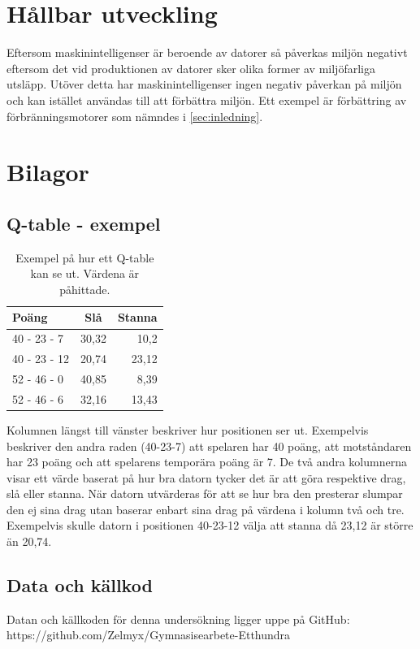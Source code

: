 \documentclass[12pt,a4paper]{article}
\begin{document}
  \section{Hållbar utveckling}\label{sec:hallbarutveckling}
    Eftersom maskinintelligenser är beroende av datorer så påverkas miljön negativt eftersom det vid produktionen av datorer sker olika former av miljöfarliga utsläpp. Utöver detta har maskinintelligenser ingen negativ påverkan på miljön och kan istället användas till att förbättra miljön. Ett exempel är förbättring av förbränningsmotorer som nämndes i \ref{sec:inledning}.

  \section{Bilagor}
    \subsection{Q-table - exempel}\label{tab:qtable} 
      \begin{table}[H] \centering 
        \caption{Exempel på hur ett Q-table kan se ut. Värdena är påhittade.} 
        \begin{tabular}{l c r} 
          \textbf{Poäng} & \textbf{Slå} & \textbf{Stanna} \\ 
          \hline 
          40 - 23 - 7    & 30,32        & 10,2 \\ 
          40 - 23 - 12   & 20,74        & 23,12 \\ 
          52 - 46 - 0    & 40,85        & 8,39 \\ 
          52 - 46 - 6    & 32,16        & 13,43 \\ 
        \end{tabular} 
      \end{table} 

      Kolumnen längst till vänster beskriver hur positionen ser ut. Exempelvis beskriver den andra raden (40-23-7) att spelaren har 40 poäng, att motståndaren har 23 poäng och att spelarens temporära poäng är 7. De två andra kolumnerna visar ett värde baserat på hur bra datorn tycker det är att göra respektive drag, slå eller stanna. När datorn utvärderas för att se hur bra den presterar slumpar den ej sina drag utan baserar enbart sina drag på värdena i kolumn två och tre. Exempelvis skulle datorn i positionen 40-23-12 välja att stanna då 23,12 är större än 20,74.

    \subsection{Data och källkod}\label{app:data} 
      Datan och källkoden för denna undersökning ligger uppe på GitHub: \\

      https://github.com/Zelmyx/Gymnasisearbete-Etthundra
\end{document}
